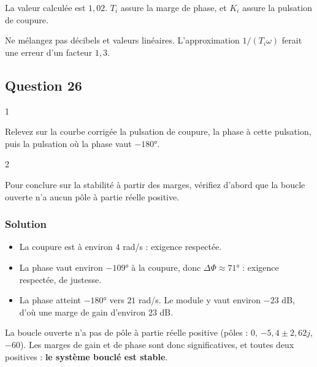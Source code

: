 \documentclass[11pt,a4paper]{article}
\providecommand{\tightlist}{\setlength{\itemsep}{0pt}\setlength{\parskip}{0pt}}
\newcommand{\equationajustee}[1]{%
  \sbox{\boiteequation}{$\displaystyle #1$}%
  \ifdim\wd\boiteequation>\linewidth
    \[\resizebox{\linewidth}{!}{\usebox{\boiteequation}}\]%
  \else
    \[#1\]%
  \fi}
\begin{document}
\equationajustee{K_i=\frac1{1{,}30\times0{,}75}}

\equationajustee{\boxed{K_i\approx1{,}0}}

La valeur calculée est \(1{,}02\). \(T_i\) assure la marge de phase, et \(K_i\) assure la pulsation de coupure.

\begin{piege}

Ne mélangez pas décibels et valeurs linéaires. L'approximation \(1/(T_i\omega)\) ferait une erreur d'un facteur \(1{,}3\).

\end{piege}

\hypertarget{question-26}{%
\subsection{Question 26}\label{question-26}}

\begin{indication}{1}

Relevez sur la courbe corrigée la pulsation de coupure, la phase à cette pulsation, puis la pulsation où la phase vaut \(-180°\).

\end{indication}

\begin{indication}{2}

Pour conclure sur la stabilité à partir des marges, vérifiez d'abord que la boucle ouverte n'a aucun pôle à partie réelle positive.

\end{indication}

\hypertarget{solution-25}{%
\subsubsection{Solution}\label{solution-25}}

\begin{itemize}
\tightlist
\item
  La coupure est à environ \(4\) rad/s : exigence respectée.
\item
  La phase vaut environ \(-109°\) à la coupure, donc \(\Delta\Phi\approx71°\) : exigence respectée, de justesse.
\item
  La phase atteint \(-180°\) vers \(21\) rad/s. Le module y vaut environ \(-23\) dB, d'où une marge de gain d'environ \(23\) dB.
\end{itemize}

La boucle ouverte n'a pas de pôle à partie réelle positive (pôles : \(0\), \(-5{,}4\pm2{,}62j\), \(-60\)). Les marges de gain et de phase sont donc significatives, et toutes deux positives : \textbf{le système bouclé est stable}.
\end{document}
